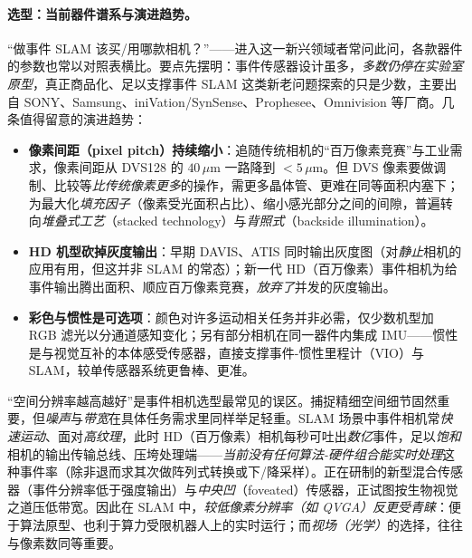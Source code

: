 \paragraph{选型：当前器件谱系与演进趋势。}
“做事件 SLAM 该买/用哪款相机？”——进入这一新兴领域者常问此问，各款器件的参数也常以对照表横比\cite{gallego2022eventsurvey}。要点先摆明：事件传感器设计虽多，\emph{多数仍停在实验室原型}，真正商品化、足以支撑事件 SLAM 这类新老问题探索的只是少数，主要出自 SONY、Samsung、iniVation/SynSense、Prophesee、Omnivision 等厂商\cite{carlone2026handbook}。几条值得留意的演进趋势：
\begin{itemize}
  \item \textbf{像素间距（pixel pitch）持续缩小}：追随传统相机的“百万像素竞赛”与工业需求，像素间距从 DVS128 的 $40\,\mu\mathrm m$ 一路降到 $<5\,\mu\mathrm m$。但 DVS 像素要做调制、比较等\emph{比传统像素更多}的操作，需更多晶体管、更难在同等面积内塞下；为最大化\emph{填充因子}（像素受光面积占比）、缩小感光部分之间的间隙，普遍转向\emph{堆叠式工艺}（stacked technology）与\emph{背照式}（backside illumination）。
  \item \textbf{HD 机型砍掉灰度输出}：早期 DAVIS、ATIS 同时输出灰度图（对\emph{静止}相机的应用有用，但这并非 SLAM 的常态）；新一代 HD（百万像素）事件相机为给事件输出腾出面积、顺应百万像素竞赛，\emph{放弃了}并发的灰度输出。
  \item \textbf{彩色与惯性是可选项}：颜色对许多运动相关任务并非必需，仅少数机型加 RGB 滤光以分通道感知变化；另有部分相机在同一器件内集成 IMU——惯性是与视觉互补的本体感受传感器，直接支撑事件-惯性里程计（VIO）与 SLAM，较单传感器系统更鲁棒、更准。
\end{itemize}

\begin{insight}
“空间分辨率越高越好”是事件相机选型最常见的误区。捕捉精细空间细节固然重要，但\emph{噪声}与\emph{带宽}在具体任务需求里同样举足轻重。SLAM 场景中事件相机常\emph{快速运动}、面对\emph{高纹理}，此时 HD（百万像素）相机每秒可吐出\emph{数亿}事件，足以\emph{饱和}相机的输出传输总线、压垮处理端——\emph{当前没有任何算法-硬件组合能实时处理}这种事件率（除非退而求其次做阵列式转换或下/降采样）\cite{carlone2026handbook}。正在研制的新型混合传感器（事件分辨率低于强度输出）与\emph{中央凹}（foveated）传感器，正试图按生物视觉之道压低带宽。因此在 SLAM 中，\emph{较低像素分辨率（如 QVGA）反更受青睐}：便于算法原型、也利于算力受限机器人上的实时运行；而\emph{视场（光学）}的选择，往往与像素数同等重要。
\end{insight}

